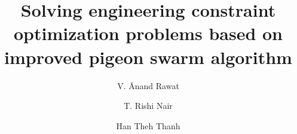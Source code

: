 \documentclass[preprint,review,compress,12pt]{elsarticle}
\begin{document}
\begin{frontmatter}



\title{Solving engineering constraint optimization problems based on improved pigeon swarm algorithm}


\author[1]{V. {{\=A}}nand Rawat}

\author[1,3]{T. Rishi Nair}

\author[2]{Han Theh Thanh }

\address[1]{Indian \TeX{} Users Group, Trivandrum 695014, India}
\address[2]{Sayahna Foundation, Jagathy, Trivandrum 695014, India}
\address[3]{\TeX{} Users Group, Providence, MA, USA}




\end{frontmatter}
\end{document}
